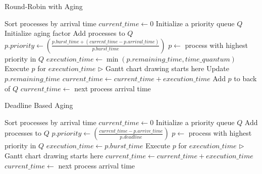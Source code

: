 \documentclass{article}
\begin{document}
\begin{algorithm}
\caption{Round-Robin with Aging}
\begin{algorithmic}[1]
\State Sort processes by arrival time
\State $current\_time \gets 0$
\State Initialize a priority queue $Q$
\State Initialize aging factor
        \State Add processes to $Q$
    \EndWhile
        \State $p.priority \gets \left(\frac{p.burst\_time + (current\_time - p.arrival\_time)}{p.burst\_time}\right)$
    \EndFor
        \State $p \gets$ process with highest priority in $Q$
        \State $execution\_time \gets \min(p.remaining\_time, time\_quantum)$
        \State Execute $p$ for $execution\_time$ $\triangleright$ Gantt chart drawing starts here
        \State Update $p.remaining\_time$
        \State $current\_time \gets current\_time + execution\_time$
            \State Add $p$ to back of $Q$
        \EndIf
    \Else
        \State $current\_time \gets$ next process arrival time
    \EndIf
\EndWhile
\end{algorithmic}
\end{algorithm}

\begin{algorithm}
\caption{Deadline Based Aging}
\begin{algorithmic}[1]
\State Sort processes by arrival time
\State $current\_time \gets 0$
\State Initialize a priority queue $Q$
        \State Add processes to $Q$
    \EndWhile
        \State $p.priority \gets \left(\frac{current\_time - p.arrive\_time}{p.deadline}\right)$
    \EndFor
        \State $p \gets$ process with highest priority in $Q$
        \State $execution\_time \gets p.burst\_time$
        \State Execute $p$ for $execution\_time$ $\triangleright$ Gantt chart drawing starts here
        \State $current\_time \gets current\_time + execution\_time$
    \Else
        \State $current\_time \gets$ next process arrival time
    \EndIf
\EndWhile
\end{algorithmic}
\end{algorithm}
\end{document}

